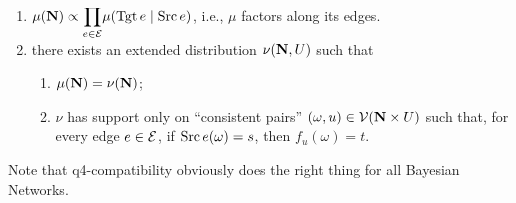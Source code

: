 \documentclass{article}
\begin{document}
\begin{defn}
\begin{enumerate}[label=\textbullet~\textit{q\arabic*-compatible} with $\Ed$ iff, labelwidth=-10em]
            \item %
            $\displaystyle 
                \mu(\mathbf{N}) \propto \smash{\prod_{e \in \mathcal E}} \mu( \mathop{\mathrm{Tgt}} e \mid \mathop{\mathrm{Src}} e)$, 
                i.e., $\mu$ factors along its edges. 
    
            \item 
                there exists an extended distribution $\nu(\mathbf{N}, U)$ such that
                \begin{enumerate}[label=(\alph*)]
                    \item $\mu(\mathbf{N}) = \nu(\mathbf{N})$;
                    \item $\nu$ has support only on ``consistent pairs'' $(\omega, u) \in \mathcal V(\mathbf{N} \times U)$
                        such that, for every edge $e \in \mathcal E$, 
                        if $\mathop{\mathrm{Src}} e (\omega) = s$, then $f_u(\omega) = t$. 
                \end{enumerate}
            
        \end{enumerate}
    \end{defn}
    
    Note that q4-compatibility obviously does the right thing for all Bayesian Networks.

    
    
\end{document}

